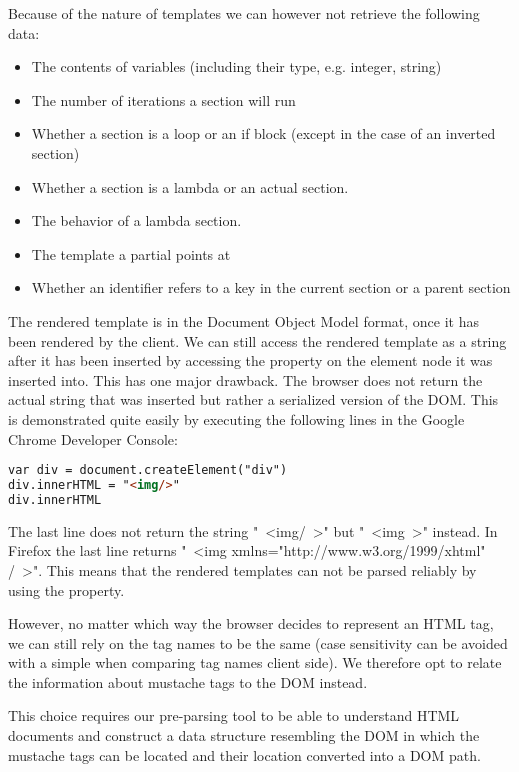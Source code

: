 Because of the nature of templates we can however not retrieve the following data:

\begin{itemize}
\item The contents of variables (including their type, e.g. integer, string)
\item The number of iterations a section will run
\item Whether a section is a loop or an if block
      (except in the case of an inverted section)
\item Whether a section is a lambda or an actual section.
\item The behavior of a lambda section.
\item The template a partial points at
\item Whether an identifier refers to a key in the current section or
      a parent section
\end{itemize}

The rendered template is in the Document Object Model format, once it has
been rendered by the client. We can still access the rendered template as a
string after it has been inserted by accessing the  property
on the element node it was inserted into. This has one major drawback.
The browser does not return the actual string that was inserted but rather a
serialized version of the DOM. This is demonstrated quite easily by executing
the following lines in the Google Chrome Developer Console:
\begin{lstlisting}[language=HTML]
var div = document.createElement("div")
div.innerHTML = "<img/>"
div.innerHTML
\end{lstlisting}

The last line does not return the string "\ <img/\ >" but "\ <img\ >" instead.
In Firefox the last line returns "\ <img xmlns="http://www.w3.org/1999/xhtml" /\ >".
This means that the rendered templates can not be parsed reliably by using the
 property.

However, no matter which way the browser decides to represent an HTML tag,
we can still rely on the tag names to be the same
(case sensitivity can be avoided with a simple
 when comparing tag names client side).
We therefore opt to relate the information about mustache tags to the DOM instead.

This choice requires our pre-parsing tool to be able to understand
HTML documents and construct a data structure resembling the DOM in which the
mustache tags can be located and their location converted into a DOM path.

